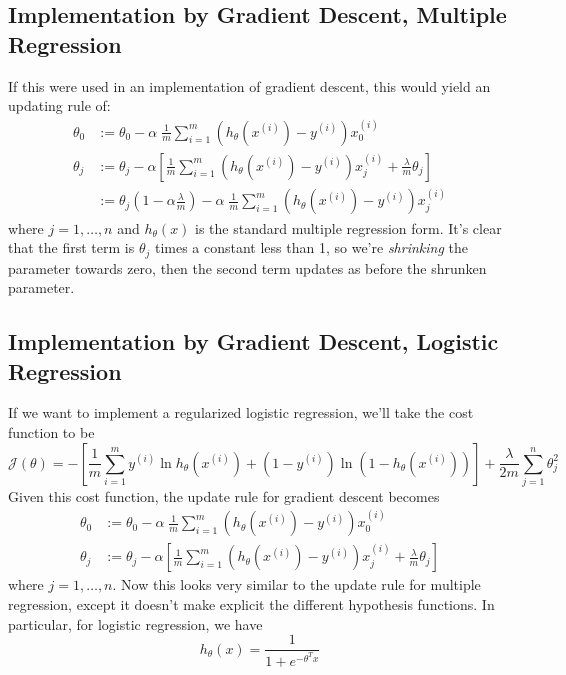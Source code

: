 \documentclass[12pt]{article}
\begin{document}
\subsection{Implementation by Gradient Descent, Multiple 
Regression}

If this were used in an implementation of gradient descent, this 
would yield an updating rule of:
\begin{align*}
   \theta_0 &:= \theta_0 - \alpha \; \frac{1}{m} \sum^m_{i=1}
   \left( h_\theta(x^{(i)})-y^{(i)}\right) x_0^{(i)}\\
   \theta_j &:= \theta_j - \alpha \left[ \frac{1}{m} \sum^m_{i=1}
   \left( h_\theta(x^{(i)})-y^{(i)}\right) x_j^{(i)} +
   \frac{\lambda}{m} \theta_j \right]\\
   &:= \theta_j\left(1-\alpha \frac{\lambda}{m}\right) - \alpha \;
   \frac{1}{m} \sum^m_{i=1}
   \left( h_\theta(x^{(i)})-y^{(i)}\right) x_j^{(i)} 
\end{align*}
where $j=1, \ldots, n$ and $h_\theta(x)$ is the standard
multiple regression form. 
It's clear that the first term is $\theta_j$
times a constant less than 1, so we're \emph{shrinking} the 
parameter towards zero, then the second term updates as before the
shrunken parameter.
   

\subsection{Implementation by Gradient Descent, Logistic 
Regression}

If we want to implement a regularized logistic regression, we'll take
the cost function to be
\begin{equation}
   \label{logreg}
   \mathcal{J}(\theta) = -\left[\frac{1}{m} \sum_{i=1}^m
   y^{(i)} \ln h_\theta(x^{(i)}) + (1-y^{(i)}) \ln \left(1-
   h_\theta(x^{(i)})\right)\right] + \frac{\lambda}{2m} \sum^n_{j=1}
   \theta_j^2
\end{equation}
Given this cost function, the update rule for gradient descent
becomes
\begin{align*}
   \theta_0 &:= \theta_0 - \alpha \; \frac{1}{m} \sum^m_{i=1}
   \left( h_\theta(x^{(i)})-y^{(i)}\right) x_0^{(i)}\\
   \theta_j &:= 
      \theta_j - \alpha \left[ \frac{1}{m} \sum^m_{i=1}
      \left( h_\theta(x^{(i)})-y^{(i)}\right) x_j^{(i)} +
      \frac{\lambda}{m} \theta_j \right]
\end{align*}
where $j=1,\ldots,n$.  Now this looks very similar to the update
rule for multiple regression, except it doesn't make explicit
the different hypothesis functions.  In particular, for logistic
regression, we have
\[ h_\theta(x) = \frac{1}{1 + e^{-\theta^T x}} \]
\end{document}
